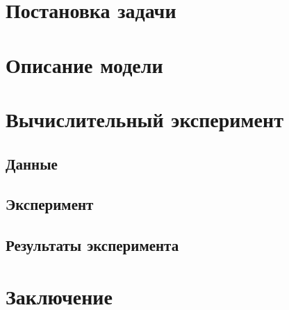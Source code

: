 \documentclass{article}
\begin{document}
\section{Постановка задачи}

\section{Описание модели} 

\section{Вычислительный эксперимент}
    
    \subsection{Данные}
  
    \subsection{Эксперимент}

    \subsection{Результаты эксперимента}

\section{Заключение}



\end{document}
